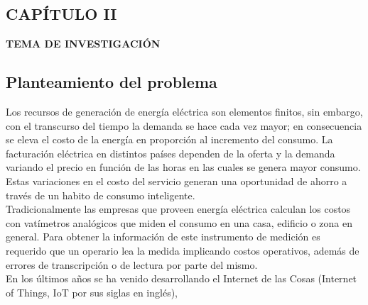 \begin{center}
    \setcounter{section}{2}
    \section*{CAPÍTULO II}
    \vspace*{0.5in}
    \textbf{TEMA DE INVESTIGACIÓN}
\end{center}

\subsection{Planteamiento del problema}

    Los recursos de generación de energía eléctrica son elementos finitos, sin embargo,  con el transcurso del tiempo la demanda se 
    hace cada vez mayor; en consecuencia se eleva el costo de la energía en proporción al incremento del consumo. La facturación eléctrica
    en distintos países dependen de la oferta y la demanda variando el precio
    en función de las horas en las cuales se genera mayor consumo. Estas variaciones en el costo del servicio generan una 
    oportunidad de ahorro a través de un habito de consumo inteligente.\\
    
    Tradicionalmente las empresas que proveen energía eléctrica calculan los costos con vatímetros analógicos que miden el 
    consumo en una casa, edificio o zona en general. Para obtener la información de este instrumento de medición es 
    requerido que un operario lea la medida implicando costos operativos, además de errores de transcripción o de lectura
    por parte del mismo.\\

    En los últimos años se ha venido desarrollando el Internet de las Cosas (Internet of Things, IoT por sus siglas en inglés),
    
